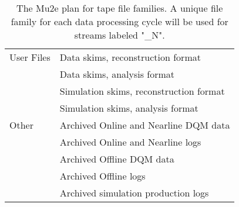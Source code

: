 \begin{table}[htb]
\begin{tabular}{|l|l|}
User Files & Data skims, reconstruction format \\
           & Data skims, analysis format  \\
           & Simulation skims, reconstruction format \\
           & Simulation skims, analysis format \\ \hline
Other      & Archived Online and Nearline DQM data\\
           & Archived Online and Nearline logs \\
           & Archived Offline DQM data \\
           & Archived Offline logs \\ 
           & Archived simulation production logs \\ \hline
\end{tabular}
\caption{The Mu2e plan for tape file families. A unique file family for each data processing cycle will be used for streams labeled "\_N".}
\label{tab:filefamilies}
\end{table}




